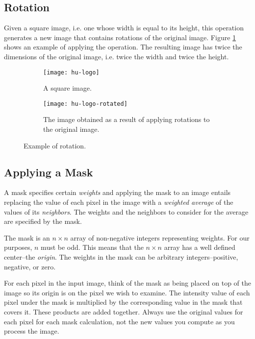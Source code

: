 \documentclass[addpoints]{exam}
\begin{document}
\subsection{Rotation}
Given a square image, i.e. one whose width is equal to its height, this operation generates a new image that contains rotations of the original image. Figure \ref{fig:rotate} shows an example of applying the operation. The resulting image has twice the dimensions of the original image, i.e. twice the width and twice the height.

\begin{figure}
  \centering
  \begin{subfigure}{.2\textwidth}
    \texttt{[image: hu-logo]}
    \caption{A square image.}
  \end{subfigure}
  \begin{subfigure}[c]{.35\textwidth}
    \texttt{[image: hu-logo-rotated]}
    \caption{The image obtained as a result of applying rotations to the original image.}
  \end{subfigure}
  \caption{Example of rotation.}
  \label{fig:rotate}
\end{figure}

\subsection{Applying a Mask}

A mask specifies certain \textit{weights} and applying the mask to an image entails replacing the value of each pixel in the image with a \textit{weighted average} of the values of its \textit{neighbors}. The weights and the neighbors to consider for the average are specified by the mask.

The  mask is an $n \times n$ array of non-negative integers representing weights. For our purposes, $n$ must be odd. This means that the $n \times n$ array has a well defined center--the \textit{origin}. The weights in the mask can be arbitrary integers--positive, negative, or zero.

For each pixel in the input image, think of the mask as being placed on top of the image so its origin is on the pixel we wish to examine. The intensity value of each pixel under the mask is multiplied by the corresponding value in the mask that covers it. These products are added together. Always use the original values for each pixel for each mask calculation, not the new values you compute as you process the image.
\end{document}
